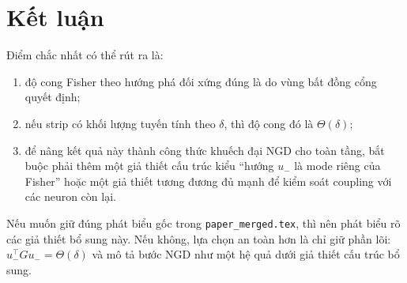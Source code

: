 \documentclass[11pt,a4paper]{article}
\begin{document}
\section{Kết luận}

Điểm chắc nhất có thể rút ra là:
\begin{enumerate}[label=(\roman*)]
    \item độ cong Fisher theo hướng phá đối xứng đúng là do vùng bất đồng cổng quyết định;
    \item nếu strip có khối lượng tuyến tính theo $\delta$, thì độ cong đó là $\Theta(\delta)$;
    \item để nâng kết quả này thành công thức khuếch đại NGD cho toàn tầng, bắt buộc phải
    thêm một giả thiết cấu trúc kiểu ``hướng $u_-$ là mode riêng của Fisher'' hoặc một giả
    thiết tương đương đủ mạnh để kiểm soát coupling với các neuron còn lại.
\end{enumerate}

Nếu muốn giữ đúng phát biểu gốc trong \texttt{paper\_merged.tex}, thì nên phát biểu rõ
các giả thiết bổ sung này. Nếu không, lựa chọn an toàn hơn là chỉ giữ phần lõi:
$u_-^\top G u_- = \Theta(\delta)$ và mô tả bước NGD như một hệ quả dưới giả thiết cấu trúc
bổ sung.
\end{document}
